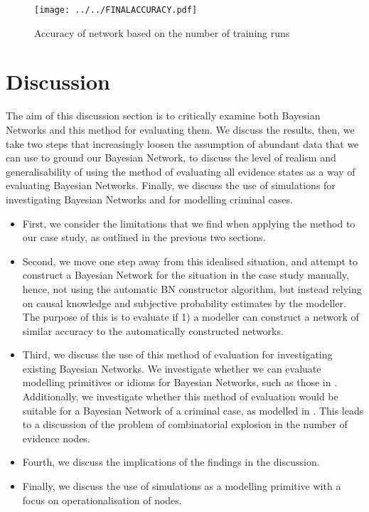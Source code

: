 \documentclass[12pt]{article}
\begin{document}
\begin{figure}[htbp]
\begin{center}
\texttt{[image: ../../FINALACCURACY.pdf]}
\caption{Accuracy of network based on the number of training runs}
\label{girl}
\end{center}
\end{figure}




\newpage



\section{Discussion}
The aim of this discussion section is to critically examine both Bayesian Networks and this method for evaluating them. We discuss the results, then, we take two steps that increasingly loosen the assumption of abundant data that we can use to ground our Bayesian Network, to discuss the level of realism and generalisability of using the method of evaluating all evidence states as a way of evaluating Bayesian Networks. Finally, we discuss the use of simulations for investigating Bayesian Networks and for modelling criminal cases.

\begin{itemize}
\item First, we consider the limitations that we find when applying the method to our case study, as outlined in the previous two sections. 
\item Second, we move one step away from this idealised situation, and attempt to construct a Bayesian Network for the situation in the case study manually, hence, not using the automatic BN constructor algorithm, but instead relying on causal knowledge and subjective probability estimates by the modeller. The purpose of this is to evaluate if 1) a modeller can construct a network of similar accuracy to the automatically constructed networks. 
\item Third, we discuss the use of this method of evaluation for investigating existing Bayesian Networks. We investigate whether we can evaluate modelling primitives or idioms for Bayesian Networks, such as those in \citep{deZoete2019}. Additionally, we investigate whether this method of evaluation would be suitable for a Bayesian Network of a criminal case, as modelled in \citep{vanLeeuwen2019}. This leads to a discussion of the problem of combinatorial explosion in the number of evidence nodes.
\item Fourth, we discuss the implications of the findings in the discussion.
\item Finally, we discuss the use of simulations as a modelling primitive with a focus on operationalisation of nodes.

\end{itemize}
\end{document}
